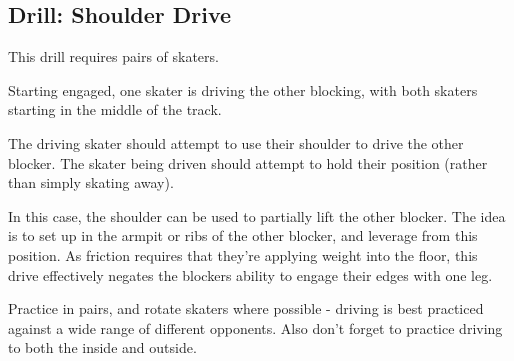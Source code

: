 \subsection*{Drill: Shoulder Drive}
\label{drill:drives/shoulder}

This drill requires pairs of skaters. 

Starting engaged, one skater is driving the other blocking, with both skaters starting in the middle of the track. 

The driving skater should attempt to use their shoulder to drive the other blocker.  
The skater being driven should attempt to hold their position (rather than simply skating away).


In this case, the shoulder can be used to partially lift the other blocker.
The idea is to set up in the armpit or ribs of the other blocker, and leverage from this position.
As friction requires that they're applying weight into the floor, this drive effectively negates the blockers ability to engage their edges with one leg.    


Practice in pairs, and rotate skaters where possible - driving is best practiced against a wide range of different opponents.
Also don't forget to practice driving to both the inside and outside.


